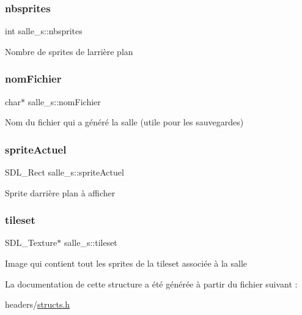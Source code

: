 \subsubsection{\texorpdfstring{nbsprites}{nbsprites}}
{\footnotesize\ttfamily int salle\+\_\+s\+::nbsprites}

Nombre de sprites de l\textquotesingle{}arrière plan \mbox{\label{structsalle__s_a12e47589795f5ed60109cf2b073ec671}} 
\subsubsection{\texorpdfstring{nom\+Fichier}{nomFichier}}
{\footnotesize\ttfamily char$\ast$ salle\+\_\+s\+::nom\+Fichier}

Nom du fichier qui a généré la salle (utile pour les sauvegardes) \mbox{\label{structsalle__s_ad8bdafa725de50b0b00688980c362d74}} 
\subsubsection{\texorpdfstring{sprite\+Actuel}{spriteActuel}}
{\footnotesize\ttfamily S\+D\+L\+\_\+\+Rect salle\+\_\+s\+::sprite\+Actuel}

Sprite d\textquotesingle{}arrière plan à afficher \mbox{\label{structsalle__s_a44a7c08d109019af0e4877e488cef708}} 
\subsubsection{\texorpdfstring{tileset}{tileset}}
{\footnotesize\ttfamily S\+D\+L\+\_\+\+Texture$\ast$ salle\+\_\+s\+::tileset}

Image qui contient tout les sprites de la tileset associée à la salle 

La documentation de cette structure a été générée à partir du fichier suivant \+:\begin{DoxyCompactItemize}
\item 
headers/\hyperlink{structs_8h}{structs.\+h}\end{DoxyCompactItemize}
